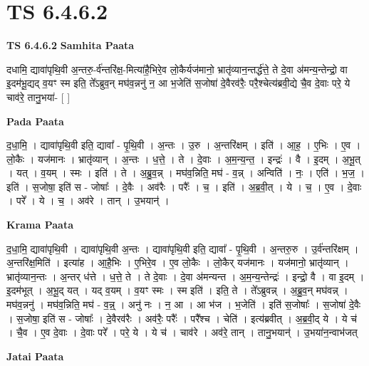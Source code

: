 \documentclass[17pt]{extarticle}
\begin{document}
\section{ TS 6.4.6.2 }

\textbf{TS 6.4.6.2 } \newline
\textbf{Samhita Paata} \newline

दधामि॒ द्यावा॑पृथि॒वी अ॒न्तरु॒-र्व॑न्तरि॑क्ष॒-मित्या॑है॒भिरे॒व लो॒कैर्यज॑मानो॒ भ्रातृ॑व्यान॒न्तर्द्ध॑त्ते॒ ते दे॒वा अ॑मन्य॒न्तेन्द्रो॒ वा इ॒दम॑भू॒द्यद् व॒यꣳ स्म इति॒ ते᳚ऽब्रुव॒न् मघ॑व॒न्ननु॑ न॒ आ भ॒जेति॑ स॒जोषा॑ दे॒वैरव॑रैः॒ परै॒श्चेत्य॑ब्रवी॒द्ये चै॒व दे॒वाः परे॒ ये चाव॑रे॒ तानु॒भया॑- [  ] \newline

\textbf{Pada Paata} \newline

द॒धा॒मि॒ । द्यावा॑पृथि॒वी इति॒ द्यावा᳚ - पृ॒थि॒वी । अ॒न्तः । उ॒रु । अ॒न्तरि॑क्षम् । इति॑ । आ॒ह॒ । ए॒भिः । ए॒व । लो॒कैः । यज॑मानः । भ्रातृ॑व्यान् । अ॒न्तः । ध॒त्ते॒ । ते । दे॒वाः । अ॒म॒न्य॒न्त॒ । इन्द्रः॑ । वै । इ॒दम् । अ॒भू॒त् । यत् । व॒यम् । स्मः । इति॑ । ते । अ॒ब्रु॒व॒न्न् । मघ॑व॒न्निति॒ मघ॑ - व॒न्न् । अन्विति॑ । नः॒ । एति॑ । भ॒ज॒ । इति॑ । स॒जोषा॒ इति॑ स - जोषाः᳚ । दे॒वैः । अव॑रैः । परैः᳚ । च॒ । इति॑ । अ॒ब्र॒वी॒त् । ये । च॒ । ए॒व । दे॒वाः । परे᳚ । ये । च॒ । अव॑रे । तान् । उ॒भयान्॑ ।  \newline


\textbf{Krama Paata} \newline

द॒धा॒मि॒ द्यावा॑पृथि॒वी । द्यावा॑पृथि॒वी अ॒न्तः । द्यावा॑पृथि॒वी इति॒ द्यावा᳚ - पृ॒थि॒वी । अ॒न्तरु॒रु । उ॒र्व॑न्तरि॑क्षम् । अ॒न्तरि॑क्ष॒मिति॑ । इत्या॑ह । आ॒है॒भिः । ए॒भिरे॒व । ए॒व लो॒कैः । लो॒कैर् यज॑मानः । यज॑मानो॒ भ्रातृ॑व्यान् । भ्रातृ॑व्यान॒न्तः । अ॒न्तर् ध॑त्ते । ध॒त्ते॒ ते । ते दे॒वाः । दे॒वा अ॑मन्यन्त । अ॒म॒न्य॒न्तेन्द्रः॑ । इन्द्रो॒ वै । वा इ॒दम् । इ॒दम॑भूत् । अ॒भू॒द् यत् । यद् व॒यम् । व॒यꣳ स्मः । स्म इति॑ । इति॒ ते । ते᳚ऽब्रुवन्न् । अ॒ब्रु॒व॒न् मघ॑वन्न् । मघ॑व॒न्ननु॑ । मघ॑व॒न्निति॒ मघ॑ - व॒न्न्॒ । अनु॑ नः । न॒ आ । आ भ॑ज । भ॒जेति॑ । इति॑ स॒जोषाः᳚ । स॒जोषा॑ दे॒वैः । स॒जोषा॒ इति॑ स - जोषाः᳚ । दे॒वैरव॑रैः । अव॑रैः॒ परैः᳚ । परै᳚श्च । चेति॑ । इत्य॑ब्रवीत् । अ॒ब्र॒वी॒द् ये । ये च॑ । चै॒व । ए॒व दे॒वाः । दे॒वाः परे᳚ । परे॒ ये । ये च॑ । चाव॑रे । अव॑रे॒ तान् । तानु॒भयान्॑ । उ॒भया॑न॒न्वाभ॑जत् \newline

\textbf{Jatai Paata} \newline
\end{document}
